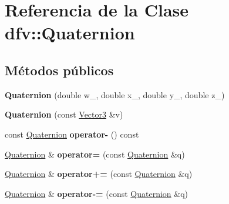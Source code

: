 \hypertarget{classdfv_1_1Quaternion}{\section{\-Referencia de la \-Clase dfv\-:\-:\-Quaternion}
\label{classdfv_1_1Quaternion}
}
\subsection*{\-Métodos públicos}
\begin{DoxyCompactItemize}
\item 
\hypertarget{classdfv_1_1Quaternion_a239d4109488e9f46124aeabd6180ea20}{{\bfseries \-Quaternion} (double w\-\_\-, double x\-\_\-, double y\-\_\-, double z\-\_\-)}\label{classdfv_1_1Quaternion_a239d4109488e9f46124aeabd6180ea20}

\item 
\hypertarget{classdfv_1_1Quaternion_a0f89714025bf6e5a7a6a5bfb2f1271d6}{{\bfseries \-Quaternion} (const \hyperlink{classdfv_1_1Vector3}{\-Vector3} \&v)}\label{classdfv_1_1Quaternion_a0f89714025bf6e5a7a6a5bfb2f1271d6}

\item 
\hypertarget{classdfv_1_1Quaternion_aa1cefcee3c9810a16520be2dbd0d830f}{const \hyperlink{classdfv_1_1Quaternion}{\-Quaternion} {\bfseries operator-\/} () const }\label{classdfv_1_1Quaternion_aa1cefcee3c9810a16520be2dbd0d830f}

\item 
\hypertarget{classdfv_1_1Quaternion_a6301cfa00246664d767765fb692fb0e0}{\hyperlink{classdfv_1_1Quaternion}{\-Quaternion} \& {\bfseries operator=} (const \hyperlink{classdfv_1_1Quaternion}{\-Quaternion} \&q)}\label{classdfv_1_1Quaternion_a6301cfa00246664d767765fb692fb0e0}

\item 
\hypertarget{classdfv_1_1Quaternion_a5b9939d9065cba305b8983c1475a8b8f}{\hyperlink{classdfv_1_1Quaternion}{\-Quaternion} \& {\bfseries operator+=} (const \hyperlink{classdfv_1_1Quaternion}{\-Quaternion} \&q)}\label{classdfv_1_1Quaternion_a5b9939d9065cba305b8983c1475a8b8f}

\item 
\hypertarget{classdfv_1_1Quaternion_a3fdafbcff5c33582758e88fbb5458e6e}{\hyperlink{classdfv_1_1Quaternion}{\-Quaternion} \& {\bfseries operator-\/=} (const \hyperlink{classdfv_1_1Quaternion}{\-Quaternion} \&q)}\label{classdfv_1_1Quaternion_a3fdafbcff5c33582758e88fbb5458e6e}


\end{DoxyCompactItemize}
